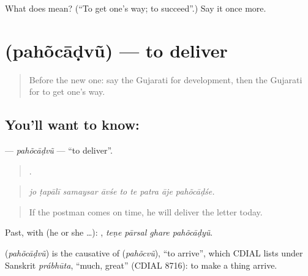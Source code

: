 \begin{tcolorbox}[breakable,colback=teal!4,colframe=teal!35!black,title={Before you move on}]
What does  mean? (\textquotedblleft{}To get one's way; to succeed\textquotedblright{}.) Say it once more.
\end{tcolorbox}
\section[\texorpdfstring{\gu{પહોંચાડવું} (pahõcāḍvũ)}{પહોંચાડવું (pahõcāḍvũ)}]{ (pahõcāḍvũ) — to deliver}

\label{lesson:GU-C384-pahocadvu}



\begin{quote}
Before the new one: say the Gujarati for development, then the Gujarati for to get one's way.
\end{quote}

\subsection*{You'll want to know: }
\textbf{} — \emph{pahõcāḍvũ} — \textquotedblleft{}to deliver\textquotedblright{}.

\begin{quote}
        .
\end{quote}

\begin{quote}
\emph{jo ṭapālī samaysar āvśe to te patra āje pahõcāḍśe.}
\end{quote}

\begin{quote}
If the postman comes on time, he will deliver the letter today.
\end{quote}

Past, with  (he or she …):    , \emph{teṇe pārsal ghare pahõcāḍyũ}.

\begin{cousinweb}
\textbf{} (\emph{pahõcāḍvũ}) is the causative of \textbf{} (\emph{pahõcvũ}), \textquotedblleft{}to arrive\textquotedblright{}, which CDIAL lists under Sanskrit \emph{prábhūta}, \textquotedblleft{}much, great\textquotedblright{} (CDIAL 8716): to make a thing arrive.
\end{cousinweb}

